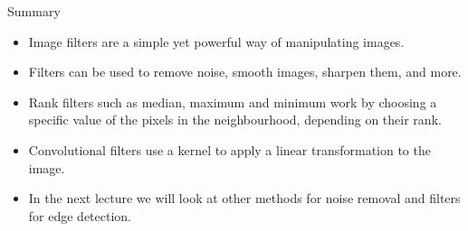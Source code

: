 \documentclass[9pt, aspectratio=169]{beamer}
\begin{document}
\begin{frame}
{Summary}
\begin{itemize}
\item Image filters are a simple yet powerful way of manipulating images.
\item Filters can be used to remove noise, smooth images, sharpen them, and more.
\item Rank filters such as median, maximum and minimum work by choosing a specific value of the pixels in the neighbourhood, depending on their rank.
\item Convolutional filters use a kernel to apply a linear transformation to the image.
\item In the next lecture we will look at other methods for noise removal and filters for edge detection.
\end{itemize}


\end{frame}
\end{document}
